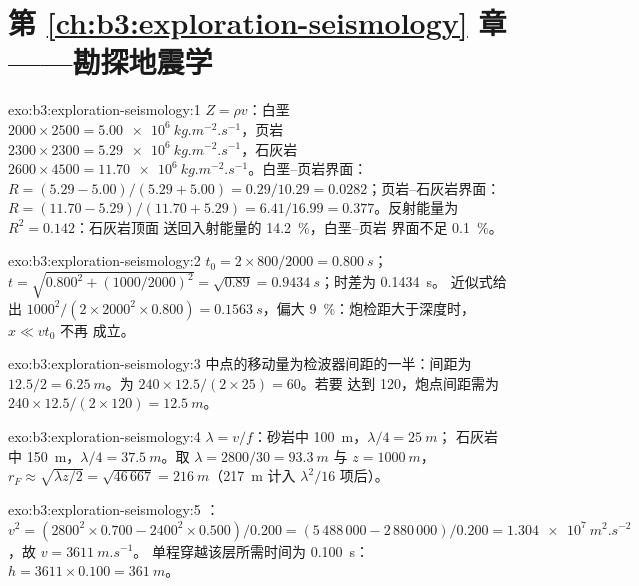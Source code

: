 \section*{第 \ref{ch:b3:exploration-seismology} 章——勘探地震学}

\begin{solution}{exo:b3:exploration-seismology:1}
$Z = \rho v$：白垩 $2000\times2500 = \qty{5.00e6}{kg.m^{-2}.s^{-1}}$，页岩
$2300\times2300 = \qty{5.29e6}{kg.m^{-2}.s^{-1}}$，石灰岩 $2600\times4500 =
\qty{11.70e6}{kg.m^{-2}.s^{-1}}$。白垩--页岩界面：$R = (5.29 - 5.00)/(5.29 + 5.00)
= 0.29/10.29 = 0.0282$；页岩--石灰岩界面：$R = (11.70 - 5.29)/(11.70 + 5.29) =
6.41/16.99 = 0.377$。反射能量为 $R^2 = 0.142$：石灰岩顶面
送回入射能量的 \qty{14.2}{\percent}，白垩–页岩
界面不足 \qty{0.1}{\percent}。
\end{solution}

\begin{solution}{exo:b3:exploration-seismology:2}
$t_0 = 2\times800/2000 = \qty{0.800}{s}$；$t = \sqrt{0.800^2 + (1000/2000)^2} =
\sqrt{0.89} = \qty{0.9434}{s}$；时差为 \qty{0.1434}{s}。
近似式给出 $1000^2/(2\times2000^2\times0.800) = \qty{0.1563}{s}$，偏大
\qty{9}{\percent}：炮检距大于深度时，$x \ll vt_0$ 不再
成立。
\end{solution}

\begin{solution}{exo:b3:exploration-seismology:3}
中点的移动量为检波器间距的一半：间距为
$12.5/2 = \qty{6.25}{m}$。为 $240\times12.5/(2\times25) = 60$。若要
达到 120，炮点间距需为 $240\times12.5/(2\times120) = \qty{12.5}{m}$。
\end{solution}

\begin{solution}{exo:b3:exploration-seismology:4}
$\lambda = v/f$：砂岩中 \qty{100}{m}，$\lambda/4 = \qty{25}{m}$；
石灰岩中 \qty{150}{m}，$\lambda/4 = \qty{37.5}{m}$。取
$\lambda = 2800/30 = \qty{93.3}{m}$ 与 $z = \qty{1000}{m}$，
$r_F \approx \sqrt{\lambda z/2} = \sqrt{46\,667} = \qty{216}{m}$（\qty{217}{m}
计入 $\lambda^2/16$ 项后）。
\end{solution}

\begin{solution}{exo:b3:exploration-seismology:5}
：$v^2 = (2800^2\times0.700 - 2400^2\times0.500)/0.200 = (5\,488\,000 -
2\,880\,000)/0.200 = \qty{1.304e7}{m^2.s^{-2}}$，故 $v = \qty{3611}{m.s^{-1}}$。
单程穿越该层所需时间为 \qty{0.100}{s}：$h = 3611\times0.100 =
\qty{361}{m}$。
\end{solution}

